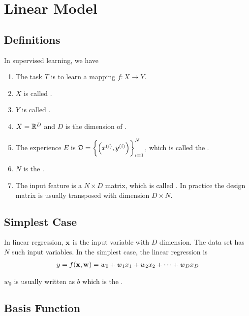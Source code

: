 \chapter{Linear Model}


\section{Definitions}
\begin{definition}
    In supervised learning, we have 
    \begin{enumerate}
        \item The task $T$ is to learn a mapping $f: X \rightarrow Y$.
        \item $X$ is called .
        \item $Y$ is called .
        \item $X = \mathbb{R}^D$ and $D$ is the dimension of .
        \item The experience $E$ is $\mathcal{D} = \set{\mleft(\selectonesample{x}{i}, \selectonesample{y}{i}\mright)}_{i=1}^N$, which is called the .
        \item $N$ is the .
        \item The input feature is a $N \times D$ matrix, which is called . In practice the design matrix is usually transposed with dimension $D \times N$.
    \end{enumerate}
\end{definition}


\section{Simplest Case}

In linear regression, $\mathbf{x}$ is the input variable with $D$ dimension. The data set has $N$ such input variables. In the simplest case, the linear regression is
\begin{align}
    y = f(\mathbf{x}, \mathbf{w}) = w_0 + w_1 {x}_{1} + w_2 {x}_{2} + \cdots + w_D {x}_{D}
\end{align}

$w_0$ is usually written as $b$ which is the . 


\section{Basis Function}


